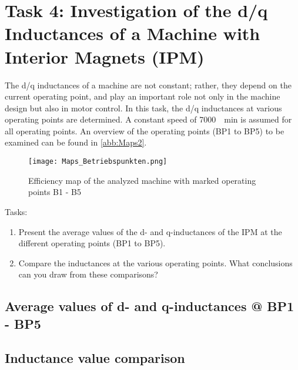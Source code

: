 %
%

\chapter{Task 4: Investigation of the d/q Inductances of a Machine with Interior Magnets (IPM)}\label{ch:dqIPM}

The d/q inductances of a machine are not constant; rather, they depend on the current operating point, and play an important role not only in the machine design but also in motor control. In this task, the d/q inductances at various operating points are determined. A constant speed of \SI{7000}{\per\minute} is assumed for all operating points. An overview of the operating points (BP1 to BP5) to be examined can be found in \autoref{abb:Maps2}.

\begin{figure}[htb]
	\centering
	\texttt{[image: Maps\_Betriebspunkten.png]}
	\caption{Efficiency map of the analyzed machine with marked operating points B1 - B5}
	\label{abb:Maps2}
\end{figure}

\bigskip

Tasks:
\begin{enumerate}
	\item Present the average values of the d- and q-inductances of the IPM at the different operating points (BP1 to BP5).
	\item Compare the inductances at the various operating points. What conclusions can you draw from these comparisons?
\end{enumerate}

\newpage

\section{Average values of d- and q-inductances @ BP1 - BP5}

\section{Inductance value comparison}

\newpage